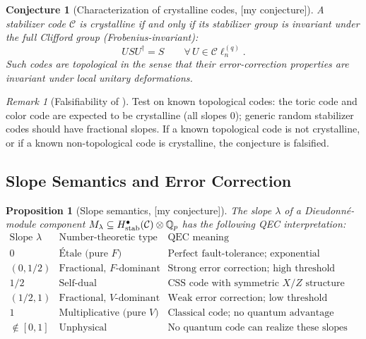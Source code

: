 \documentclass[12pt]{article}
\theoremstyle{definition}
\theoremstyle{plain}
\newtheorem{conjecture}{Conjecture}[section]
\newtheorem{proposition}{Proposition}[section]
\theoremstyle{remark}
\newtheorem{remark}{Remark}[section]
\newcommand{\myconj}{{\color{orange}[\textsf{my conjecture}]}}
\newcommand{\Qp}{\mathbb{Q}_p}
\newcommand{\cC}{\mathcal{C}}
\begin{document}
\begin{conjecture}[Characterization of crystalline codes, \myconj]\label{conj:crystalline-char}
A stabilizer code $\cC$ is crystalline if and only if its stabilizer group is invariant under the full Clifford group (Frobenius-invariant):
\[
U S U^{\dagger}=S\qquad\forall\,U\in\mathcal{C}\ell_n^{(q)}.
\]
Such codes are \emph{topological} in the sense that their error-correction properties are invariant under local unitary deformations.
\end{conjecture}

\begin{remark}[Falsifiability of ]
Test on known topological codes: the toric code and color code are expected to be crystalline (all slopes 0); generic random stabilizer codes should have fractional slopes. If a known topological code is not crystalline, or if a known non-topological code is crystalline, the conjecture is falsified.
\end{remark}

\subsection{Slope Semantics and Error Correction}

\begin{proposition}[Slope semantics, \myconj]\label{prop:slope-semantics}
The slope $\lambda$ of a Dieudonn\'{e}-module component $M_{\lambda}\subseteq H^{\bullet}_{\textup{stab}}(\cC)\otimes\Qp$ has the following QEC interpretation:
\[
\begin{array}{c|c|l}
\text{Slope }\lambda & \text{Number-theoretic type} & \text{QEC meaning}\\\hline
0 & \text{\'{E}tale (pure $F$)} & \text{Perfect fault-tolerance; exponential suppression}\\
(0,1/2) & \text{Fractional, $F$-dominant} & \text{Strong error correction; high threshold}\\
1/2 & \text{Self-dual} & \text{CSS code with symmetric $X\!/\!Z$ structure}\\
(1/2,1) & \text{Fractional, $V$-dominant} & \text{Weak error correction; low threshold}\\
1 & \text{Multiplicative (pure $V$)} & \text{Classical code; no quantum advantage}\\
\notin[0,1] & \text{Unphysical} & \text{No quantum code can realize these slopes}
\end{array}
\]
\end{proposition}
\end{document}
